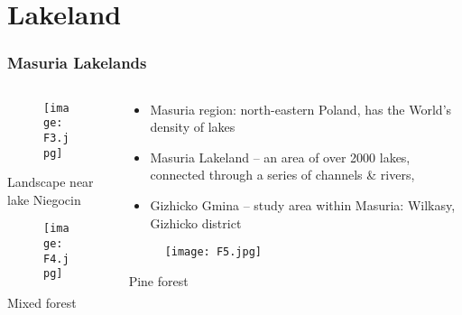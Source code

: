 \documentclass[pdflatex,compress,8pt,
	xcolor={dvipsnames,dvipsnames,svgnames,x11names,table},
	hyperref={colorlinks = true,
	breaklinks = true, urlcolor = NavyBlue, breaklinks = true}]{beamer}
\begin{document}
\section{Lakeland} 
\begin{frame}\frametitle{Masuria Lakelands}
\begin{minipage}[0.4\textheight]{\textwidth}
\begin{columns}[T]
\begin{column}{0.5\textwidth}
\vspace{2em}
\begin{figure}[H]
	\centering
		\texttt{[image: F3.jpg]}
\end{figure}
\footnotesize{Landscape near lake Niegocin}
\begin{figure}[H]
	\centering
		\texttt{[image: F4.jpg]}
\end{figure}
Mixed forest
\end{column}
\begin{column}{0.5\textwidth}
\vspace{3ex} 
\begin{itemize}
	\item Masuria region: north-eastern Poland, has the  World's density of lakes
	\item Masuria Lakeland – an area of over 2000 lakes, connected through a series of channels \& rivers,
	\item Gizhicko Gmina – study area within Masuria: Wilkasy, Gizhicko district
\end{itemize}
\vspace{1em}
\begin{figure}[H]
	\centering
		\texttt{[image: F5.jpg]}
\end{figure}
\footnotesize{Pine forest}
\end{column}
\end{columns}
\end{minipage}
\end{frame}
\end{document}
